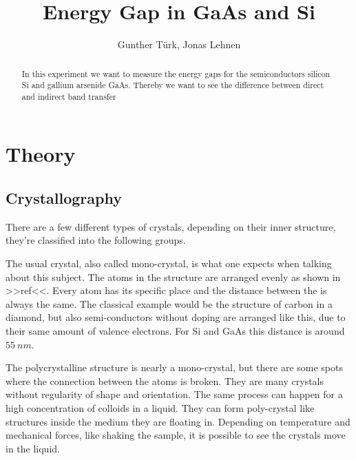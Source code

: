 \documentclass[]{article}
\title{Energy Gap in GaAs and Si}
\author{Gunther T\"urk, Jonas Lehnen}
\begin{document}
\maketitle
\begin{abstract}
In this experiment we want to measure the energy gaps for the semiconductors silicon Si and gallium arsenide GaAs. Thereby we want to see the difference between direct and indirect band transfer

\end{abstract}

\tableofcontents


\section{Theory}
\subsection{Crystallography}
There are a few different types of crystals, depending on their inner structure, they're classified into the following groups. 

The usual crystal, also called mono-crystal, is what one expects when talking about this subject. The atoms in the structure are arranged evenly as shown in >>ref<<. Every atom has its specific place and the distance between the is always the same. The classical example would be the structure of carbon in a diamond, but also semi-conductors without doping are arranged like this, due to their same amount of valence electrons. For Si and GaAs this distance is around $55\ nm$.

The polycrystalline structure is nearly a mono-crystal, but there are some spots where the connection between the atoms is broken. They are many crystals without regularity of shape and orientation. The same process can happen for a high concentration of colloids in a liquid. They can form poly-crystal like structures inside the medium they are floating in. Depending on temperature and mechanical forces, like shaking the sample, it is possible to see the crystals move in the liquid.
\end{document}
